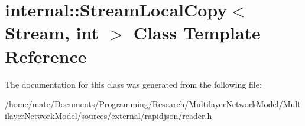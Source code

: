 \hypertarget{classinternal_1_1StreamLocalCopy}{}\section{internal\+:\+:Stream\+Local\+Copy$<$ Stream, int $>$ Class Template Reference}
\label{classinternal_1_1StreamLocalCopy}


The documentation for this class was generated from the following file\+:\begin{DoxyCompactItemize}
\item 
/home/mate/\+Documents/\+Programming/\+Research/\+Multilayer\+Network\+Model/\+Multilayer\+Network\+Model/sources/external/rapidjson/\hyperlink{reader_8h}{reader.\+h}\end{DoxyCompactItemize}
